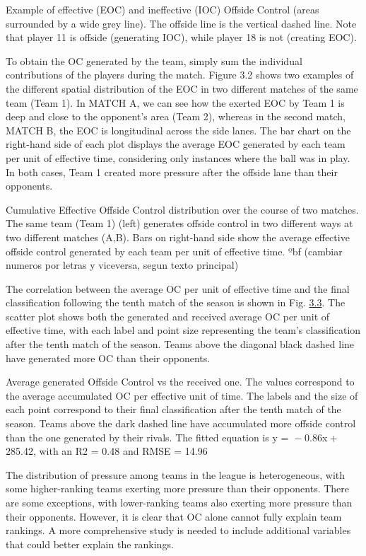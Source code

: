 \documentclass[twoside,nohyper]{tufte-book}
\begin{document}
Example of effective (EOC) and ineffective (IOC) Offside
Control (areas surrounded by a wide grey line). The offside line is the
vertical dashed line. Note that player {11} is offside (generating IOC), while player
{18} is not (creating EOC).

To obtain the OC generated by the team, simply sum the individual
contributions of the players during the match. Figure 3.2 shows two
examples of the different spatial distribution of the EOC in two
different matches of the same team (Team 1). In MATCH A, we can see how
the exerted EOC by Team 1 is deep and close to the opponent's area (Team
2), whereas in the second match, MATCH B, the EOC is longitudinal across
the side lanes. The bar chart on the right-hand side of each plot
displays the average EOC generated by each team per unit of effective
time, considering only instances where the ball was in play. In both
cases, Team 1 created more pressure after the offside lane than their
opponents.

Cumulative Effective Offside Control distribution over the
course of two matches. The same team (Team 1) (left) generates offside
control in two different ways at two different matches (A,B). Bars on
right-hand side show the average effective offside control generated by
each team per unit of effective time. {ºbf (cambiar numeros por
letras y viceversa, segun texto principal)}

The correlation between the average OC per unit of effective time and
the final classification following the tenth match of the season is
shown in Fig. \protect\hyperlink{f3.3}{3.3}. The
scatter plot shows both the generated and received average OC per unit
of effective time, with each label and point size representing the
team's classification after the tenth match of the season. Teams above
the diagonal black dashed line have generated more OC than their
opponents.

Average generated Offside Control vs the received one. The
values correspond to the average accumulated OC per effective unit of
time. The labels and the size of each point correspond to their final
classification after the tenth match of the season. Teams above the dark
dashed line have accumulated more offside control than the one generated
by their rivals. The fitted equation is {y =  − 0.86x + 285.42}, with
an {R2 = 0.48} and
{RMSE = 14.96}

The distribution of pressure among teams in the league is heterogeneous,
with some higher-ranking teams exerting more pressure than their
opponents. There are some exceptions, with lower-ranking teams also
exerting more pressure than their opponents. However, it is clear that
OC alone cannot fully explain team rankings. A more comprehensive study
is needed to include additional variables that could better explain the
rankings.
\end{document}
